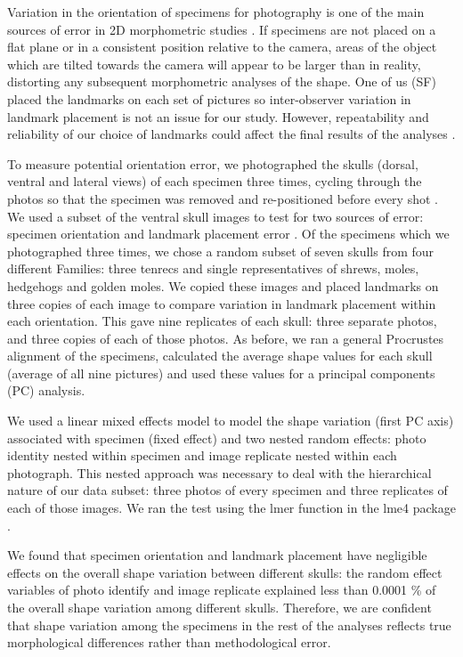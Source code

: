 \documentclass[12pt,a4paper]{article}
\begin{document}
    Variation in the orientation of specimens for photography is one of the main sources of error in 2D morphometric studies \citep{Adriaens2007}. If specimens are not placed on a flat plane or in a consistent position relative to the camera, areas of the object which are tilted towards the camera will appear to be larger than in reality, distorting any subsequent morphometric analyses of the shape. 
	One of us (SF) placed the landmarks on each set of pictures so inter-observer variation in landmark placement is not an issue for our study.  However, repeatability and reliability of our choice of landmarks could affect the final results of the analyses \citep{Arnqvist1998}.

	
	To measure potential orientation error, we photographed the skulls (dorsal, ventral and lateral views) of each specimen three times, cycling through the photos so that the specimen was removed and re-positioned before every shot \citep{Viscosi2011}.
	We used a subset of the ventral skull images to test for two sources of error: specimen orientation and landmark placement error \citep{Arnqvist1998, Barrow2008}. Of the specimens which we photographed three times, we chose a random subset of seven skulls from four different Families: three tenrecs and single representatives of shrews, moles, hedgehogs and golden moles. We copied these images and placed landmarks on three copies of each image to compare variation in landmark placement within each orientation. This gave nine replicates of each skull: three separate photos, and three copies of each of those photos. As before, we ran a general Procrustes alignment \citep{Rohlf1993} of the specimens, calculated the average shape values for each skull (average of all nine pictures) and used these values for a principal components (PC) analysis.
		
	We used a linear mixed effects model to model the shape variation (first PC axis) associated with specimen (fixed effect) and two nested random effects: photo identity nested within specimen and image replicate nested within each photograph. This nested approach was necessary to deal with the hierarchical nature of our data subset: three photos of every specimen and three replicates of each of those images. We ran the test using the lmer function in the lme4 package \citep{Bates2014}.  

	We found that specimen orientation and landmark placement have negligible effects on the overall shape variation between different skulls: the random effect variables of photo identify and image replicate explained less than 0.0001 \% of the overall shape variation among different skulls. Therefore, we are confident that shape variation among the specimens in the rest of the analyses reflects true morphological differences rather than methodological error.


 
 
\end{document}
